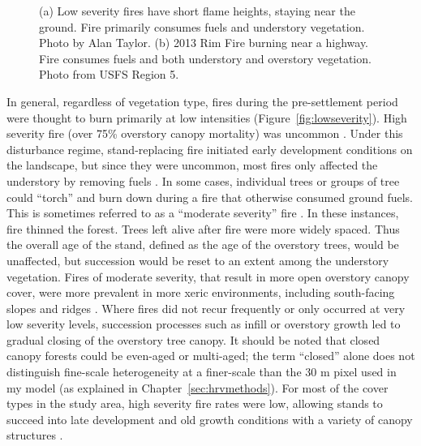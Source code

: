 \begin{figure}[!htbp]
  \centering
   \caption{(a) Low severity fires have short flame heights, staying near the ground. Fire primarily consumes fuels and understory vegetation. Photo by Alan Taylor. (b) 2013 Rim Fire burning near a highway. Fire consumes fuels and both understory and overstory vegetation. Photo from USFS Region 5.} 
\label{figs:fireseverity}
\end{figure}

In general, regardless of vegetation type, fires during the pre-settlement period were thought to burn primarily at low intensities (Figure~\ref{fig:lowseverity}). High severity fire (over 75\% overstory canopy mortality) was uncommon \citep{Skinner1996, SNEP1996a,Mallek2013,Stephens2015}. Under this disturbance regime, stand-replacing fire initiated early development conditions on the landscape, but since they were uncommon, most fires only affected the understory by removing fuels \citep{Skinner1996, SNEP1996a,Mallek2013}. In some cases, individual trees or groups of tree could ``torch'' and burn down during a fire that otherwise consumed ground fuels. This is sometimes referred to as a ``moderate severity'' fire \citep{Beaty2001}. In these instances, fire thinned the forest. Trees left alive after fire were more widely spaced. Thus the overall age of the stand, defined as the age of the overstory trees, would be unaffected, but succession would be reset to an extent among the understory vegetation. Fires of moderate severity, that result in more open overstory canopy cover, were more prevalent in more xeric environments, including south-facing slopes and ridges \citep{Mallek2013,Safford2014,SNEP1996a,SNEP1996}. Where fires did not recur frequently or only occurred at very low severity levels, succession processes such as infill or overstory growth led to gradual closing of the overstory tree canopy. It should be noted that closed canopy forests could be even-aged or multi-aged; the term ``closed'' alone does not distinguish fine-scale heterogeneity at a finer-scale than the 30 m pixel used in my model (as explained in Chapter~\ref{sec:hrvmethods}). For most of the cover types in the study area, high severity fire rates were low, allowing stands to succeed into late development and old growth conditions with a variety of canopy structures \citep{Mallek2013,Safford2014,SNEP1996a,SNEP1996}. 


